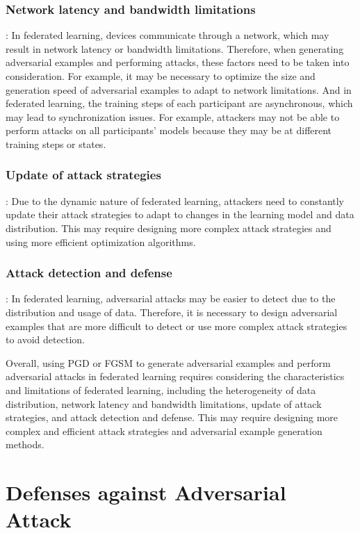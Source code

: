 \documentclass[conference]{IEEEtran}
\begin{document}
\subsubsection{Network latency and bandwidth limitations}: In federated learning,
devices communicate through a network, which may result in network
latency or bandwidth limitations. Therefore, when generating adversarial
examples and performing attacks, these factors need to be taken into
consideration. For example, it may be necessary to optimize the size
and generation speed of adversarial examples to adapt to network limitations.
And in federated learning, the training steps of each participant are asynchronous,
which may lead to synchronization issues. For example, attackers may not be able
to perform attacks on all participants' models because they may be at
different training steps or states.

\subsubsection{Update of attack strategies}: Due to the dynamic nature of federated
learning, attackers need to constantly update their attack strategies
to adapt to changes in the learning model and data distribution. This
may require designing more complex attack strategies and using more
efficient optimization algorithms.

\subsubsection{Attack detection and defense}: In federated learning, adversarial
attacks may be easier to detect due to the distribution and usage
of data. Therefore, it is necessary to design adversarial examples
that are more difficult to detect or use more complex attack strategies
to avoid detection.

Overall, using PGD or FGSM to generate adversarial examples and perform
adversarial attacks in federated learning requires considering the
characteristics and limitations of federated learning, including
the heterogeneity of data distribution, network latency and bandwidth
limitations, update of attack strategies, and attack detection and defense.
This may require designing more complex and efficient attack strategies
and adversarial example generation methods.


\section{Defenses against Adversarial Attack}
\end{document}
